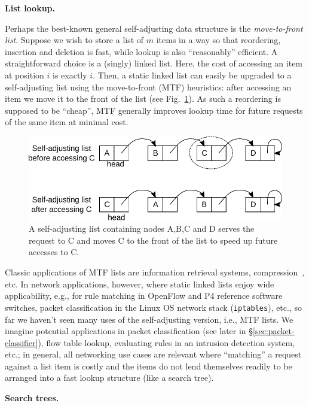 \noindent%
\textbf{List lookup.} %


Perhaps the best-known general self-adjusting data structure is the \emph{move-to-front list}. Suppose we wish to store a list of $m$ items in a way so that reordering, insertion and deletion is fast, while lookup is also ``reasonably'' efficient. A straightforward choice is a (singly) linked list. Here, the cost of accessing an item at position $i$ is exactly $i$. Then, a static linked list can easily be upgraded to a self-adjusting list using the move-to-front (MTF) heuristics: after accessing an item we move it to the front of the list (see Fig.~\ref{fig:mtf-example}). As such a reordering is supposed to be ``cheap'', MTF generally improves lookup time for future requests of the same item at minimal cost.


\begin{figure}
  \centering
  \includegraphics[width=.85\linewidth]{fig/mtf.pdf}
  \caption{A self-adjusting list containing nodes A,B,C and D serves the request to C and moves C to the front of the list to speed up future accesses to C.}
  \label{fig:mtf-example}
\end{figure}

Classic applications of MTF lists are information retrieval systems, compression~\cite{BentleySTW86}, etc. In network applications, however, where static linked lists enjoy wide applicability, e.g., for rule matching in OpenFlow and P4 reference software switches, packet classification in the Linux OS network stack (\texttt{iptables}), etc., so far we haven't seen many uses of the self-adjusting version, i.e., MTF lists. We imagine potential applications in packet classification (see later in \S\ref{sec:packet-classifier}), flow table lookup, evaluating rules in an intrusion detection system, etc.; in general, all networking use cases are relevant where ``matching'' a request against a list item is costly and the items do not lend themselves readily to be arranged into a fast lookup structure (like a search tree).



\noindent%
\textbf{Search trees.}


